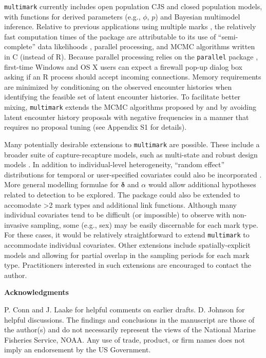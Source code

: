 \documentclass[12pt]{article}
\begin{document}
\verb|multimark| currently includes open population CJS and closed population models, with functions for derived parameters (e.g., $\phi$, $p$) and Bayesian multimodel inference. Relative to previous applications using multiple marks \citep{BonnerHolmberg2013,McClintockEtAl2013a}, the relatively fast computation times of the package are attributable to its use of ``semi-complete'' data likelihoods \citep{KingEtAl2015}, parallel processing, and MCMC algorithms written in C (instead of R). Because parallel processing relies on the \verb|parallel| package \citep{RTeam2013}, first-time Windows and OS X users can expect a firewall pop-up dialog box asking if an R process should accept incoming connections. Memory requirements are minimized by conditioning on the observed encounter histories when identifying the feasible set of latent encounter histories. To facilitate better mixing, \verb|multimark| extends the MCMC algorithms proposed by \cite{BonnerHolmberg2013} and \cite{McClintockEtAl2013a,McClintockEtAl2014} by avoiding latent encounter history proposals with negative frequencies in a manner that requires no proposal tuning (see Appendix S1 for details).

Many potentially desirable extensions to \verb|multimark| are possible. These include a broader suite of capture-recapture models, such as multi-state and robust design models \citep[e.g.,][]{WilliamsEtAl2002}. In addition to individual-level heterogeneity, ``random effect'' distributions for temporal or user-specified covariates could also be incorporated \citep[e.g.,][]{LaakeEtAl2013}. More general modelling formulae for ${\boldsymbol \delta}$ and $\alpha$ would allow additional hypotheses related to detection to be explored. The package could also be extended to accomodate >2 mark types and additional link functions. Although many individual covariates tend to be difficult (or impossible) to observe with non-invasive sampling, some (e.g., sex) may be easily discernable for each mark type. For these cases, it would be relatively straightforward to extend \verb|multimark| to accommodate individual covariates. Other extensions include spatially-explicit models \citep[e.g.,][]{Royle2015} and allowing for partial overlap in the sampling periods for each mark type. Practitioners interested in such extensions are encouraged to contact the author.

\noindent \textbf{Acknowledgments} 

\noindent P. Conn and J. Laake for helpful comments on earlier drafts. D. Johnson for helpful discussions. The findings and conclusions in the manuscript are those of the author(s) and do not necessarily represent the views of the National Marine Fisheries Service, NOAA. Any use of trade, product, or firm names does not imply an endorsement by the US Government.



\end{document}
